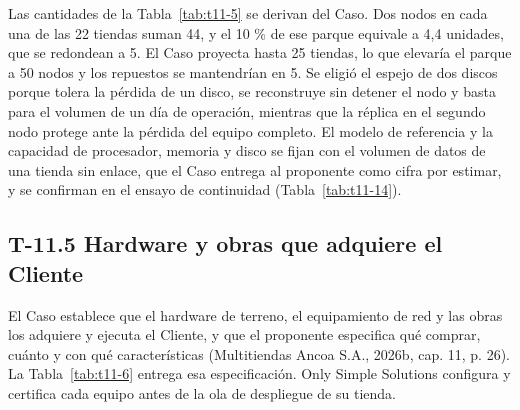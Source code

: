 \documentclass[11pt]{article}
\begin{document}
Las cantidades de la Tabla~\mbox{\ref{tab:t11-5}} se derivan del Caso. Dos nodos en cada una de las 22 tiendas suman 44, y el 10 \% de ese parque equivale a 4,4 unidades, que se redondean a 5. El Caso proyecta hasta 25 tiendas, lo que elevaría el parque a 50 nodos y los repuestos se mantendrían en 5. Se eligió el espejo de dos discos porque tolera la pérdida de un disco, se reconstruye sin detener el nodo y basta para el volumen de un día de operación, mientras que la réplica en el segundo nodo protege ante la pérdida del equipo completo. El modelo de referencia y la capacidad de procesador, memoria y disco se fijan con el volumen de datos de una tienda sin enlace, que el Caso entrega al proponente como cifra por estimar, y se confirman en el ensayo de continuidad (Tabla~\mbox{\ref{tab:t11-14}}).

\subsection{T-11.5 Hardware y obras que adquiere el Cliente}\label{t-11-5}

El Caso establece que el hardware de terreno, el equipamiento de red y las obras los adquiere y ejecuta el Cliente, y que el proponente especifica qué comprar, cuánto y con qué características (Multitiendas Ancoa S.A., 2026b, cap. 11, p. 26). La Tabla~\mbox{\ref{tab:t11-6}} entrega esa especificación. Only Simple Solutions configura y certifica cada equipo antes de la ola de despliegue de su tienda.
\end{document}
